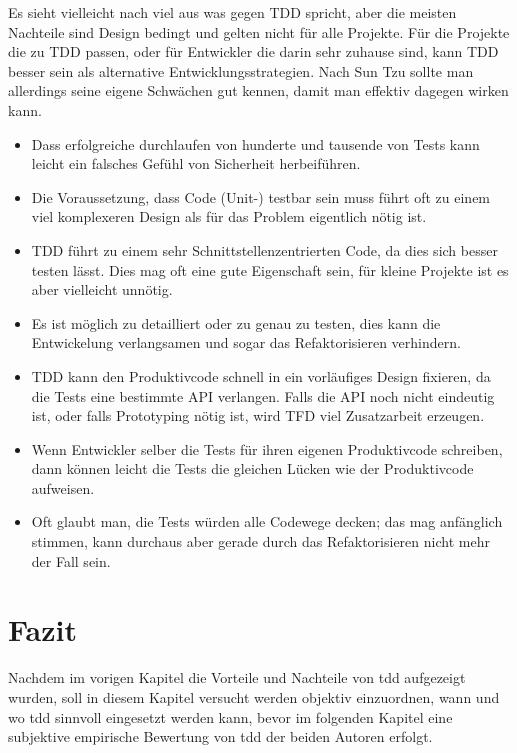 \documentclass[a4paper,10pt]{scrartcl}
\newcommand{\pje}{\marginpar{Philipp\\Jeske}}
\begin{document}
Es sieht vielleicht nach viel aus was gegen TDD spricht, aber die meisten
Nachteile sind Design bedingt und gelten nicht für alle Projekte. Für die
Projekte die zu TDD passen, oder für Entwickler die darin sehr zuhause sind,
kann TDD besser sein als alternative Entwicklungsstrategien. Nach Sun Tzu
sollte man allerdings seine eigene Schwächen gut kennen, damit man effektiv
dagegen wirken kann.

\begin{itemize}
    \item Dass erfolgreiche durchlaufen von hunderte und tausende von Tests
        kann leicht ein falsches Gefühl von Sicherheit herbeiführen.
        \cite{StackExchange}
    \item Die Voraussetzung, dass Code (Unit-) testbar sein muss führt oft zu
        einem viel komplexeren Design als für das Problem eigentlich nötig ist.
        \cite{StackExchange}
    \item TDD führt zu einem sehr Schnittstellenzentrierten Code, da dies sich
        besser testen lässt. Dies mag oft eine gute Eigenschaft sein, für
        kleine Projekte ist es aber vielleicht unnötig.
    \item Es ist möglich zu detailliert oder zu genau zu testen, dies kann die
        Entwickelung verlangsamen und sogar das Refaktorisieren verhindern.
    \item TDD kann den Produktivcode schnell in ein vorläufiges Design fixieren,
        da die Tests eine bestimmte API verlangen. Falls die API noch nicht
        eindeutig ist, oder falls Prototyping nötig ist, wird TFD viel
        Zusatzarbeit erzeugen. \cite{StackOverflow}
    \item Wenn Entwickler selber die Tests für ihren eigenen Produktivcode
        schreiben, dann können leicht die Tests die gleichen Lücken wie der
        Produktivcode aufweisen.
    \item Oft glaubt man, die Tests würden alle Codewege decken; das mag
        anfänglich stimmen, kann durchaus aber gerade durch das Refaktorisieren
        nicht mehr der Fall sein.
\end{itemize}

\section{Fazit}\label{Fazit}\pje
Nachdem im vorigen Kapitel die Vorteile und Nachteile von \gls{tdd} aufgezeigt wurden,
soll in diesem Kapitel versucht werden objektiv einzuordnen, wann und wo \gls{tdd} sinnvoll
eingesetzt werden kann, bevor im folgenden Kapitel eine subjektive empirische 
Bewertung von \gls{tdd} der beiden Autoren erfolgt.
\end{document}
